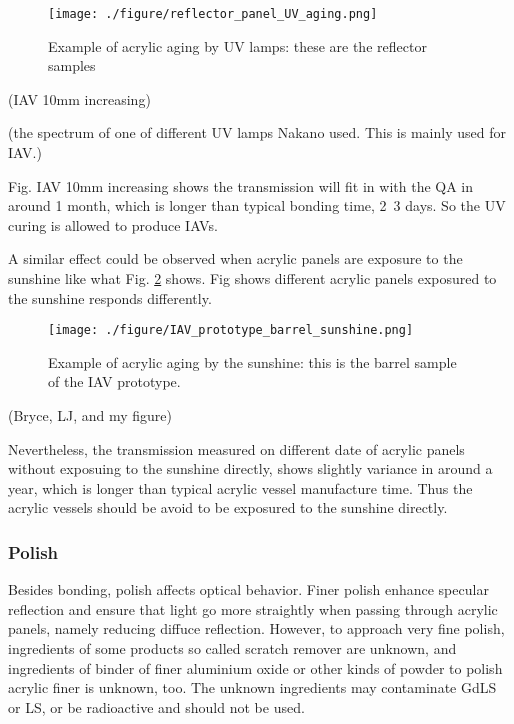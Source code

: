 \begin{figure}
    \centering
    \texttt{[image: ./figure/reflector\_panel\_UV\_aging.png]}
    \caption{Example of acrylic aging by UV lamps: these are the reflector samples}
    \label{ReflectorAging}
    \end{figure}



(IAV 10mm increasing)


(the spectrum of one of different UV lamps Nakano used. This is mainly used for IAV.)


Fig. IAV 10mm increasing shows the transmission will fit in with the QA in around 1 month, which is longer than typical
bonding time, 2~3 days. So the UV curing is allowed to produce IAVs.

A similar effect could be observed when acrylic panels are exposure to the sunshine like what
Fig. \ref{IAVPrototypeBarrelSunshineAging} shows. Fig shows different
acrylic panels exposured to the sunshine responds differently.


\begin{figure}
    \centering
    \texttt{[image: ./figure/IAV\_prototype\_barrel\_sunshine.png]}
    \caption{Example of acrylic aging by the sunshine: this is the barrel sample of the IAV prototype.}
    \label{IAVPrototypeBarrelSunshineAging}
    \end{figure}

(Bryce, LJ, and my figure)


Nevertheless, the transmission measured on different date of acrylic panels without exposuing to the sunshine directly,
shows slightly variance in around a year, which is longer than typical acrylic vessel manufacture time.
Thus the acrylic vessels should be avoid to be exposured to the sunshine directly.


\subsubsection {Polish}

Besides bonding, polish affects optical behavior.
Finer polish enhance specular reflection and ensure that light
go more straightly when passing through acrylic panels, namely
reducing diffuce reflection. However, to approach very fine polish,
ingredients of some products so called scratch remover are unknown, and
ingredients of binder of finer aluminium oxide or other kinds of powder to polish
acrylic finer is unknown, too. The unknown ingredients may contaminate GdLS or LS, or
be radioactive and should not be used.

